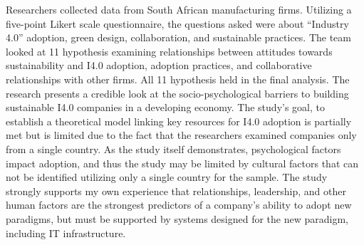 

\begin{adjustwidth}{1in}{}
  \begin{hangpara}{.25in}{1}
   \end{hangpara}
\end{adjustwidth}

Researchers collected data from South African manufacturing firms. Utilizing a five-point Likert scale questionnaire, the questions asked were about ``Industry 4.0'' adoption, green design, collaboration, and sustainable practices. The team looked at 11 hypothesis examining relationships between attitudes towards sustainability and I4.0 adoption, adoption practices, and collaborative relationships with other firms. All 11 hypothesis held in the final analysis. The research presents a credible look at the socio-psychological barriers to building sustainable I4.0 companies in a developing economy. The study's goal, to establish a theoretical model linking key resources for I4.0 adoption is partially met but is limited due to the fact that the researchers examined companies only from a single country. As the study itself demonstrates, psychological factors impact adoption, and thus the study may be limited by cultural factors that can not be identified utilizing only a single country for the sample. The study strongly supports my own experience that relationships, leadership, and other human factors are the strongest predictors of a company's ability to adopt new paradigms, but must be supported by systems designed for the new paradigm, including IT infrastructure.



